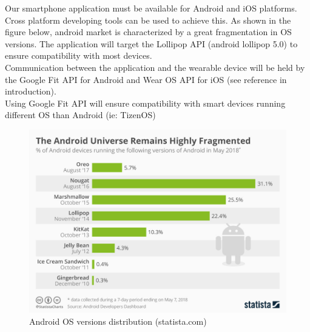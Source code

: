 \documentclass[../main.tex]{subfiles}
\begin{document}
Our smartphone application must be available for Android and iOS platforms. Cross platform developing tools can be used to achieve this.
As shown in the figure below, android market is characterized by a great fragmentation in OS versions. The application will target the Lollipop API (android lollipop 5.0) to ensure compatibility with most devices.\\
Communication between the application and the wearable device will be held by the Google Fit API for Android and Wear OS API for iOS (see reference in introduction).\\
Using Google Fit API will ensure compatibility with smart devices running different OS than Android (ie: TizenOS)
\begin{figure}[H]
	\center
	\includegraphics[scale=0.35]{images/statista_androidFragmentation.jpg}
	\caption{Android OS versions distribution (statista.com)}
\end{figure}
\end{document}
